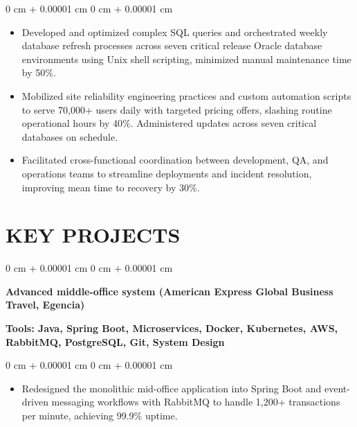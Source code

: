\documentclass[10pt, letterpaper]{article}
\newenvironment{highlights}{
    \begin{itemize}[
        topsep=0.10 cm,
        parsep=0.10 cm,
        partopsep=0pt,
        itemsep=0pt,
        leftmargin=0 cm + 10pt
    ]
}{
    \end{itemize}
} %
\newenvironment{onecolentry}{
    \begin{adjustwidth}{
        0 cm + 0.00001 cm
    }{
        0 cm + 0.00001 cm
    }
}{
    \end{adjustwidth}
} %
\begin{document}
        \vspace{0.10 cm}
        \begin{onecolentry}
            \begin{highlights}
                \item Developed and optimized complex SQL queries and orchestrated weekly database refresh processes across seven critical release Oracle database environments using Unix shell scripting, minimized manual maintenance time by 50\%.
                
                \item Mobilized site reliability engineering practices and custom automation scripts to serve 70,000+ users daily with targeted pricing offers, slashing routine operational hours by 40\%. Administered updates across seven critical databases on schedule.

                
                \item Facilitated cross-functional coordination between development, QA, and operations teams to streamline deployments and incident resolution, improving mean time to recovery by 30\%.
            \end{highlights}
        \end{onecolentry}
    
    \vspace{0.1 cm}
    \section{KEY PROJECTS}
    \vspace{0.1 cm}
        \begin{onecolentry}
            \textbf{Advanced middle-office system (American Express Global Business Travel, Egencia)}
        \end{onecolentry}
        \textbf{Tools: Java, Spring Boot, Microservices, Docker, Kubernetes, AWS, RabbitMQ, PostgreSQL, Git, System Design}

        \vspace{0.10 cm}
        \begin{onecolentry}
            \begin{highlights}
                \item Redesigned the monolithic mid-office application into Spring Boot and event-driven messaging workflows with RabbitMQ to handle 1,200+ transactions per minute, achieving 99.9\% uptime.
            \end{highlights}
        \end{onecolentry}
\end{document}
